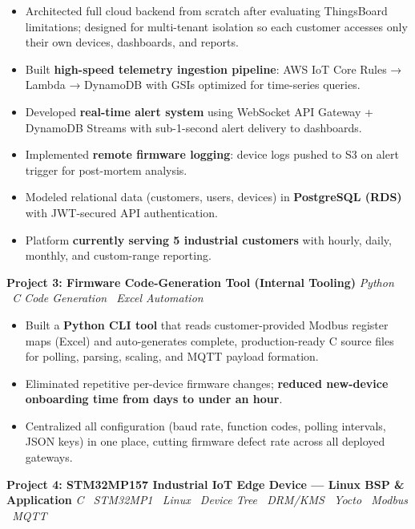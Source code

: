 \documentclass[letterpaper,10.5pt]{article}
\newcommand{\resumeItem}[1]{%
  \item\small{\color{darkgray}#1\vspace{-1pt}}}
\newcommand{\resumeItemListStart}{\begin{itemize}[leftmargin=0.18in,topsep=1pt]}
\newcommand{\resumeItemListEnd}{\end{itemize}\vspace{-3pt}}
\newcommand{\tech}[1]{\textit{\small\color{medgray}#1}}
\begin{document}
  \resumeItemListStart
    \resumeItem{Architected full cloud backend from scratch after evaluating ThingsBoard limitations; designed for multi-tenant isolation so each customer accesses only their own devices, dashboards, and reports.}
    \resumeItem{Built \textbf{high-speed telemetry ingestion pipeline}: AWS IoT Core Rules → Lambda → DynamoDB with GSIs optimized for time-series queries.}
    \resumeItem{Developed \textbf{real-time alert system} using WebSocket API Gateway + DynamoDB Streams with sub-1-second alert delivery to dashboards.}
    \resumeItem{Implemented \textbf{remote firmware logging}: device logs pushed to S3 on alert trigger for post-mortem analysis.}
    \resumeItem{Modeled relational data (customers, users, devices) in \textbf{PostgreSQL (RDS)} with JWT-secured API authentication.}
    \resumeItem{Platform \textbf{currently serving 5 industrial customers} with hourly, daily, monthly, and custom-range reporting.}
  \resumeItemListEnd

  \vspace{4pt}
  \textbf{\small\color{navy}Project 3: Firmware Code-Generation Tool (Internal Tooling)}
  \hfill\tech{Python \textbullet\ C Code Generation \textbullet\ Excel Automation}

  \resumeItemListStart
    \resumeItem{Built a \textbf{Python CLI tool} that reads customer-provided Modbus register maps (Excel) and auto-generates complete, production-ready C source files for polling, parsing, scaling, and MQTT payload formation.}
    \resumeItem{Eliminated repetitive per-device firmware changes; \textbf{reduced new-device onboarding time from days to under an hour}.}
    \resumeItem{Centralized all configuration (baud rate, function codes, polling intervals, JSON keys) in one place, cutting firmware defect rate across all deployed gateways.}
  \resumeItemListEnd

  \vspace{4pt}
  \textbf{\small\color{navy}Project 4: STM32MP157 Industrial IoT Edge Device — Linux BSP \& Application}
  \hfill\tech{C \textbullet\ STM32MP1 \textbullet\ Linux \textbullet\ Device Tree \textbullet\ DRM/KMS \textbullet\ Yocto \textbullet\ Modbus \textbullet\ MQTT}
\end{document}
